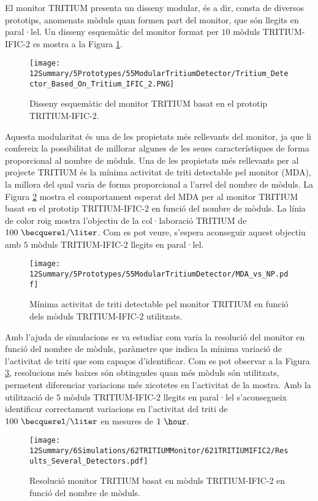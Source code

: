 El monitor TRITIUM presenta un disseny modular, és a dir, consta de diversos prototips, anomenats mòduls quan formen part del monitor, que són llegits en paral·lel. Un disseny esquemàtic del monitor format per $10$ mòduls TRITIUM-IFIC-2 es mostra a la Figura \ref{fig:10TritiumMonitorIFIC2}.
\begin{figure}[h]
\centering
\texttt{[image: 12Summary/5Prototypes/55ModularTritiumDetector/Tritium\_Detector\_Based\_On\_Tritium\_IFIC\_2.PNG]}
\caption{Disseny esquemàtic del monitor TRITIUM basat en el prototip TRITIUM-IFIC-2.\label{fig:10TritiumMonitorIFIC2}}
\end{figure}
Aquesta modularitat és una de les propietats més rellevants del monitor, ja que li confereix la possibilitat de millorar algunes de les seues característiques de forma proporcional al nombre de mòduls. Una de les propietats més rellevants per al projecte TRITIUM és la mínima activitat de triti detectable pel monitor (MDA), la millora del qual varia de forma proporcional a l'arrel del nombre de mòduls. La Figura \ref{fig:MDATritiumMonitorIFIC2} mostra el comportament esperat del MDA per al monitor TRITIUM basat en el prototip TRITIUM-IFIC-2 en funció del nombre de mòduls. La línia de color roig mostra l'objectiu de la col·laboració TRITIUM de $100~\becquerel/\liter$. Com es pot veure, s'espera aconseguir aquest objectiu amb $5$ mòduls TRITIUM-IFIC-2 llegits en paral·lel.

\begin{figure}[h]
\centering
\texttt{[image: 12Summary/5Prototypes/55ModularTritiumDetector/MDA\_vs\_NP.pdf]}
\caption{Mínima activitat de triti detectable pel monitor TRITIUM en funció dels mòduls TRITIUM-IFIC-2 utilitzats.\label{fig:MDATritiumMonitorIFIC2}}
\end{figure}

Amb l'ajuda de simulacions es va estudiar com varia la resolució del monitor en funció del nombre de mòduls, paràmetre que indica la mínima variació de l'activitat de triti que som capaços d'identificar. Com es pot observar a la Figura \ref{fig:ResolucioTritiumMonitorIFIC2},  resolucions més baixes són obtingudes quan més mòduls són utilitzats, permetent diferenciar variacions més xicotetes en l'activitat de la mostra. Amb la utilització de $5$ mòduls TRITIUM-IFIC-2 llegits en paral·lel s'aconsegueix identificar correctament variacions en l'activitat del triti de $100~\becquerel/\liter$ en mesures de $1~\hour$.

\begin{figure}[h]
\centering
\texttt{[image: 12Summary/6Simulations/62TRITIUMMonitor/621TRITIUMIFIC2/Results\_Several\_Detectors.pdf]}
\caption{Resolució monitor TRITIUM basat en mòduls TRITIUM-IFIC-2 en funció del nombre de mòduls.\label{fig:ResolucioTritiumMonitorIFIC2}}
\end{figure}